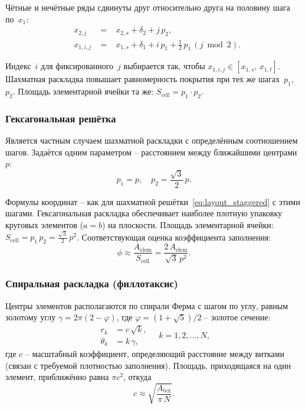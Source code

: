 Чётные и нечётные ряды сдвинуты друг относительно друга на
половину шага по~$x_1$:
\begin{equation}
  \begin{alignedat}{2}
    & x_{2,j}   &\;=\;& x_{2,s} + \delta_2 + j\,p_2, \\
    & x_{1,i,j} &\;=\;& x_{1,s} + \delta_1 + i\,p_1
                  + \tfrac{1}{2}\,p_1\,(j \bmod 2).
  \end{alignedat}
  \label{eq:layout_staggered}
\end{equation}

Индекс~$i$ для фиксированного~$j$ выбирается так, чтобы
$x_{1,i,j} \in [x_{1,s},\, x_{1,t}]$.
Шахматная раскладка повышает равномерность покрытия при тех же
шагах~$p_1$, $p_2$. Площадь элементарной ячейки та же:
$S_{\mathrm{cell}} = p_1 \cdot p_2$.


\subsubsection*{Гексагональная решётка}

Является частным случаем шахматной раскладки с определённым
соотношением шагов. Задаётся одним параметром -- расстоянием между
ближайшими центрами~$p$:
\begin{equation}
  p_1 = p, \quad p_2 = \frac{\sqrt{3}}{2}\,p.
  \label{eq:layout_hex}
\end{equation}

Формулы координат -- как для шахматной
решётки~\eqref{eq:layout_staggered} с этими шагами.
Гексагональная раскладка обеспечивает наиболее плотную упаковку
круговых элементов ($a = b$) на плоскости. Площадь элементарной ячейки:
$S_{\mathrm{cell}} = p_1\,p_2 = \frac{\sqrt{3}}{2}\,p^2$.
Соответствующая оценка коэффициента заполнения:
\[
  \phi \approx \frac{A_{\mathrm{elem}}}{S_{\mathrm{cell}}}
    = \frac{2\,A_{\mathrm{elem}}}{\sqrt{3}\,p^2}.
\]


\subsubsection*{Спиральная раскладка (филлотаксис)}

Центры элементов располагаются по спирали Ферма с шагом по углу,
равным золотому углу $\gamma = 2\pi(2 - \varphi)$, где
$\varphi = (1 + \sqrt{5})/2$ -- золотое сечение:
\begin{equation}
  \begin{aligned}
    r_k      &= c\,\sqrt{k}, \\
    \theta_k &= k\,\gamma,
  \end{aligned}
  \quad k = 1, 2, \ldots, N,
  \label{eq:layout_phyllotaxis}
\end{equation}
где $c$ -- масштабный коэффициент, определяющий расстояние между
витками (связан с требуемой плотностью заполнения). Площадь,
приходящаяся на один элемент, приближённо равна $\pi c^2$, откуда
\begin{equation}
  c \approx \sqrt{\frac{A_{\mathrm{tex}}}{\pi\,N}}.
  \label{eq:phyllotaxis_c}
\end{equation}


